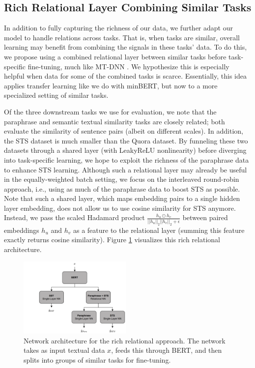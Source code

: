 \documentclass{article}
\begin{document}
\subsection{Rich Relational Layer Combining Similar Tasks}
 In addition to fully capturing the richness of our data, we further adapt our model to handle relations across tasks. That is, when tasks are similar, overall learning may benefit from combining the signals in these tasks' data. To do this, we propose using a combined relational layer between similar tasks before task-specific fine-tuning, much like MT-DNN \cite{MTL}. We hypothesize this is especially helpful when data for some of the combined tasks is scarce. Essentially, this idea applies transfer learning like we do with minBERT, but now to a more specialized setting of similar tasks.
 
 Of the three downstream tasks we use for evaluation, we note that the paraphrase and semantic textual similarity tasks are closely related; both evaluate the similarity of sentence pairs (albeit on different scales). In addition, the STS dataset is much smaller than the Quora dataset. By funneling these two datasets through a shared layer (with LeakyReLU nonlinearity) before diverging into task-specific learning, we hope to exploit the richness of the paraphrase data to enhance STS learning. Although such a relational layer may already be useful in the equally-weighted batch setting, we focus on the interleaved round-robin approach, i.e., using as much of the paraphrase data to boost STS as possible. Note that such a shared layer, which maps embedding pairs to a single hidden layer embedding, does not allow us to use cosine similarity for STS anymore. Instead, we pass the scaled Hadamard product $\frac{h_u \odot h_v}{||h_u||_2 ||h_v||_2 + \epsilon}$ between paired embeddings $h_u$ and $h_v$ as a feature to the relational layer (summing this feature exactly returns cosine similarity). Figure \ref{fig: rich-rel-fig} visualizes this rich relational architecture.

 \begin{figure}[h]
    \centering
    \includegraphics[width=0.49\textwidth]{writeup/rich-rel.png}
    \caption{Network architecture for the rich relational approach. The network takes as input textual data $x$, feeds this through BERT, and then splits into groups of similar tasks for fine-tuning.}
    \label{fig: rich-rel-fig}
\end{figure}
\end{document}
